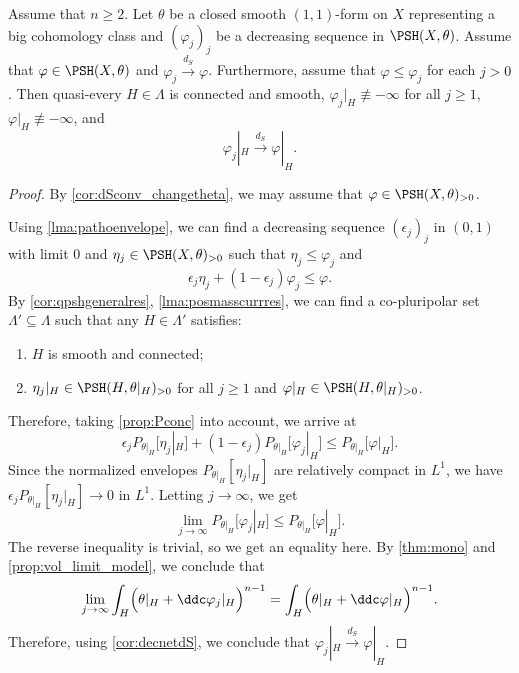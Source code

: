 \begin{lemma}\label{lma:Igoodrest}
Assume that $n\geq 2$.
    Let $\theta$ be a closed smooth $(1,1)$-form on $X$ representing a big cohomology class and $(\varphi_j)_j$ be a decreasing sequence in $\PSH(X,\theta)$. Assume that $\varphi\in \PSH(X,\theta)$ and $\varphi_j\xrightarrow{d_S}\varphi$. Furthermore, assume that $\varphi\leq \varphi_j$ for each $j>0$.
    Then quasi-every $H\in \Lambda$ is connected and smooth, $\varphi_j|_H\not\equiv-\infty$ for all $j\geq 1$, $\varphi|_H\not\equiv -\infty$, and
    \[
    \varphi_j|_H\xrightarrow{d_S}\varphi|_H.
    \]
\end{lemma}
\begin{proof}
    By \cref{cor:dSconv_changetheta}, we may assume that $\varphi\in \PSH(X,\theta)_{>0}$.

    Using \cref{lma:pathoenvelope}, we can find a decreasing sequence $(\epsilon_j)_j$ in $(0,1)$ with limit $0$ and $\eta_j\in \PSH(X,\theta)_{>0}$ such that $\eta_j\leq \varphi_j$ and
    \[
    \epsilon_j\eta_j+(1-\epsilon_j)\varphi_j\leq \varphi.
    \]
    By \cref{cor:qpshgeneralres}, \cref{lma:posmasscurrres}, we can find a co-pluripolar set $\Lambda'\subseteq \Lambda$ such that any $H\in \Lambda'$ satisfies:
    \begin{enumerate}
        \item\label{itm:chapter-trace:L1048:1} $H$ is smooth and connected;
        \item\label{itm:chapter-trace:L1048:2} $\eta_j|_H\in \PSH(H,\theta|_H)_{>0}$ for all $j\geq 1$ and $\varphi|_H\in \PSH(H,\theta|_H)_{>0}$.
    \end{enumerate}
    Therefore, taking \cref{prop:Pconc} into account, we arrive at
    \[
    \epsilon_j P_{\theta|_H}\bigl[\eta_j|_H\bigr]+\left(1-\epsilon_j\right)P_{\theta|_H}\bigl[\varphi_j|_H\bigr]\leq P_{\theta|_H}\bigl[\varphi|_H\bigr].
    \]
    Since the normalized envelopes $P_{\theta|_H}[\eta_j|_H]$ are relatively compact in $L^1$, we have $\epsilon_jP_{\theta|_H}[\eta_j|_H]\to 0$ in $L^1$. Letting $j\to\infty$, we get
    \[
    \lim_{j\to\infty} P_{\theta|_H}\bigl[\varphi_j|_H\bigr]\leq P_{\theta|_H}\bigl[\varphi|_H\bigr].
    \]
    The reverse inequality is trivial, so we get an equality here.
    By \cref{thm:mono} and \cref{prop:vol_limit_model}, we conclude that
    \[
    \lim_{j\to\infty}\int_H \Bigl(\theta|_H+\ddc \varphi_j|_H\Bigr)^{n-1}=\int_H \Bigl(\theta|_H+\ddc \varphi|_H\Bigr)^{n-1}.
    \]
    Therefore, using \cref{cor:decnetdS}, we conclude that $\varphi_j|_H\xrightarrow{d_S}\varphi|_H$.
\end{proof}

